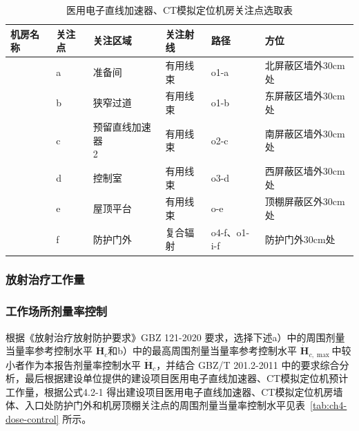 \begin{table}[H]
\centering
\caption{医用电子直线加速器、CT模拟定位机房关注点选取表}
\label{tab:ch4-points}
\setlength{\tabcolsep}{4pt}
\begin{tabular}{|
>{\centering\arraybackslash}m{1.2cm}|
>{\centering\arraybackslash}m{1.0cm}|
>{\centering\arraybackslash}m{3.6cm}|
>{\centering\arraybackslash}m{1.8cm}|
>{\centering\arraybackslash}m{1.2cm}|
>{\centering\arraybackslash}m{5.2cm}|
}
\hline
机房名称 & 关注点 & 关注区域 & 关注射线 & 路径 & 方位 \\
\hline
\multirow{6}{=}{\centering 医用电子直线加速器、CT模拟定位机房}
& a & 准备间 & 有用线束 & o1-a & 北屏蔽区墙外30cm处 \\
\cline{2-6}
& b & 狭窄过道 & 有用线束 & o1-b & 东屏蔽区墙外30cm处 \\
\cline{2-6}
& c & \makecell{预留直线加速器\\2} & 有用线束 & o2-c & 南屏蔽区墙外30cm处 \\
\cline{2-6}
& d & 控制室 & 有用线束 & o3-d & 西屏蔽区墙外30cm处 \\
\cline{2-6}
& e & 屋顶平台 & 有用线束 & o-e & 顶棚屏蔽区外30cm处 \\
\cline{2-6}
& f & 防护门外 & 复合辐射 & o4-f、o1-i-f & 防护门外30cm处 \\
\hline
\end{tabular}
\end{table}





\subsubsection{放射治疗工作量}



\subsubsection{工作场所剂量率控制}

根据《放射治疗放射防护要求》GBZ 121-2020 要求，选择下述a）中的周围剂量当量率参考控制水平 $\dot { { \boldsymbol { H } } } _ { c }$和b）中的最高周围剂量当量率参考控制水平 $\dot{\boldsymbol{H} } _ {c,\max}$中较小者作为本报告剂量率控制水平 $\dot { { \boldsymbol { H } } } _ { c }$，并结合 GBZ/T 201.2-2011 中的要求综合分析，最后根据建设单位提供的建设项目医用电子直线加速器、CT模拟定位机预计工作量，根据公式4.2-1 得出建设项目医用电子直线加速器、CT模拟定位机房墙体、入口处防护门外和机房顶棚关注点的周围剂量当量率控制水平见表~\ref{tab:ch4-dose-control} 所示。


